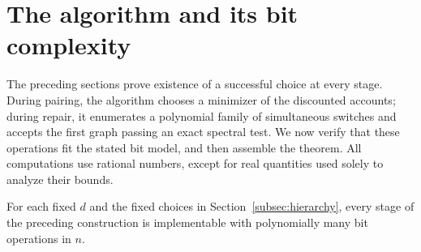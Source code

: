 \section{The algorithm and its bit complexity}\label{sec:algorithm}

The preceding sections prove existence of a successful choice at every
stage. During pairing, the algorithm chooses a minimizer of the discounted
accounts; during repair, it enumerates a polynomial family of simultaneous
switches and accepts the first graph passing an exact spectral test.
We now verify that these operations fit the stated bit model, and then
assemble the theorem. All computations use rational
numbers, except for real quantities used solely to analyze their bounds.


\begin{proposition}\label{prop:bit-complexity}
For each fixed $d$ and the fixed choices in Section~\ref{subsec:hierarchy}, every
stage of the preceding construction is implementable with polynomially
many bit operations in $n$.
\end{proposition}

